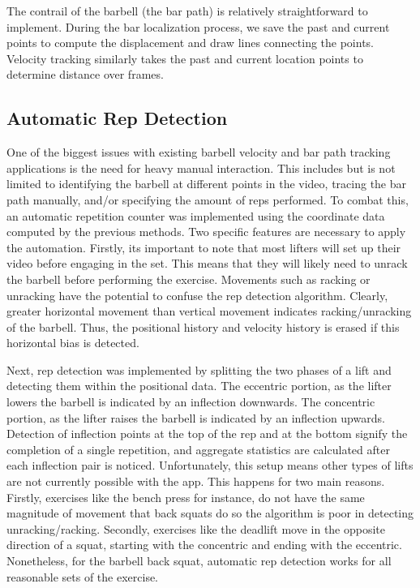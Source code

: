 \documentclass[10pt,twocolumn]{article}
\begin{document}
The contrail of the barbell (the bar path) is relatively straightforward to implement.
During the bar localization process, we save the past and current points to compute the displacement and draw lines connecting the points.
Velocity tracking similarly takes the past and current location points to determine distance over frames. \par

\subsection{Automatic Rep Detection}
One of the biggest issues with existing barbell velocity and bar path tracking applications is the need for heavy manual interaction.
This includes but is not limited to identifying the barbell at different points in the video, tracing the bar path manually, and/or specifying the amount of reps performed.
To combat this, an automatic repetition counter was implemented using the coordinate data computed by the previous methods.
Two specific features are necessary to apply the automation.
Firstly, its important to note that most lifters will set up their video before engaging in the set.
This means that they will likely need to unrack the barbell before performing the exercise.
Movements such as racking or unracking have the potential to confuse the rep detection algorithm.
Clearly, greater horizontal movement than vertical movement indicates racking/unracking of the barbell.
Thus, the positional history and velocity history is erased if this horizontal bias is detected. \par

Next, rep detection was implemented by splitting the two phases of a lift and detecting them within the positional data.
The eccentric portion, as the lifter lowers the barbell is indicated by an inflection downwards.
The concentric portion, as the lifter raises the barbell is indicated by an inflection upwards.
Detection of inflection points at the top of the rep and at the bottom signify the completion of a single repetition, and aggregate statistics are calculated after each inflection pair is noticed.
Unfortunately, this setup means other types of lifts are not currently possible with the app.
This happens for two main reasons.
Firstly, exercises like the bench press for instance, do not have the same magnitude of movement that back squats do so the algorithm is poor in detecting unracking/racking.
Secondly, exercises like the deadlift move in the opposite direction of a squat, starting with the concentric and ending with the eccentric.
Nonetheless, for the barbell back squat, automatic rep detection works for all reasonable sets of the exercise.
\end{document}
